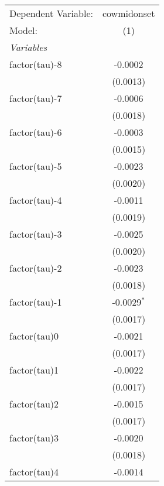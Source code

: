\begingroup
\centering
\begin{tabular}{lc}
   \tabularnewline \midrule \midrule
   Dependent Variable:             & cowmidonset\\  
   Model:                          & (1)\\  
   \midrule
   \emph{Variables}\\
   factor(tau)-8                   & -0.0002\\   
                                   & (0.0013)\\   
   factor(tau)-7                   & -0.0006\\   
                                   & (0.0018)\\   
   factor(tau)-6                   & -0.0003\\   
                                   & (0.0015)\\   
   factor(tau)-5                   & -0.0023\\   
                                   & (0.0020)\\   
   factor(tau)-4                   & -0.0011\\   
                                   & (0.0019)\\   
   factor(tau)-3                   & -0.0025\\   
                                   & (0.0020)\\   
   factor(tau)-2                   & -0.0023\\   
                                   & (0.0018)\\   
   factor(tau)-1                   & -0.0029$^{*}$\\   
                                   & (0.0017)\\   
   factor(tau)0                    & -0.0021\\   
                                   & (0.0017)\\   
   factor(tau)1                    & -0.0022\\   
                                   & (0.0017)\\   
   factor(tau)2                    & -0.0015\\   
                                   & (0.0017)\\   
   factor(tau)3                    & -0.0020\\   
                                   & (0.0018)\\   
   factor(tau)4                    & -0.0014\\   

\end{tabular}
